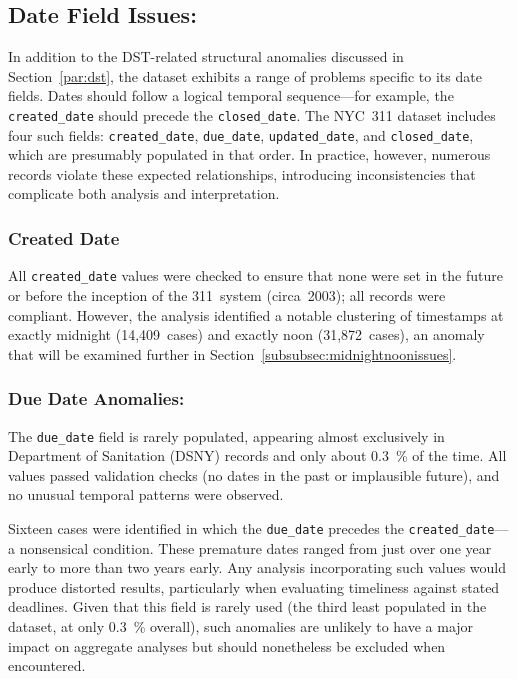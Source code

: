 \documentclass[linenumber]{jdsart}
\begin{document}
\subsection{Date Field Issues:}
\label{subsec:datefieldissues}
In addition to the DST-related structural anomalies discussed in 
Section~\ref{par:dst}, the dataset exhibits a range of problems 
specific to its date fields. 
Dates should follow a logical temporal sequence—for example, the 
\texttt{created\_date} should precede the \texttt{closed\_date}. 
The NYC~311 dataset includes four such fields: 
\texttt{created\_date}, \texttt{due\_date}, \texttt{updated\_date}, 
and \texttt{closed\_date}, which are presumably populated in that order. 
In practice, however, numerous records violate these expected relationships, 
introducing inconsistencies that complicate both analysis and interpretation.

\subsubsection{Created Date }
\label{subsubsec:createddate}
All \texttt{created\_date} values were checked to ensure that none were set 
in the future or before the inception of the 311~system (circa~2003); all 
records were compliant. 
However, the analysis identified a notable clustering of timestamps at 
exactly midnight (14{,}409~cases) and exactly noon (31{,}872~cases), 
an anomaly that will be examined further in 
Section~\ref{subsubsec:midnightnoonissues}.

\subsubsection{Due Date Anomalies:}
\label{subsubsec:duedate}
The \texttt{due\_date} field is rarely populated, appearing almost 
exclusively in Department of Sanitation (\textsc{DSNY}) records and 
only about \SI{0.3}{\percent} of the time. 
All values passed validation checks (no dates in the past or implausible 
future), and no unusual temporal patterns were observed.

Sixteen cases were identified in which the \texttt{due\_date} precedes the 
\texttt{created\_date}---a nonsensical condition. These premature 
dates ranged from just over one year early to more than 
two years early. 
Any analysis incorporating such values would produce distorted results, 
particularly when evaluating timeliness against stated deadlines. 
Given that this field is rarely used (the third least populated in the 
dataset, at only \SI{0.3}{\percent} overall), such anomalies are unlikely 
to have a major impact on aggregate analyses but should nonetheless be 
excluded when encountered.
\end{document}
